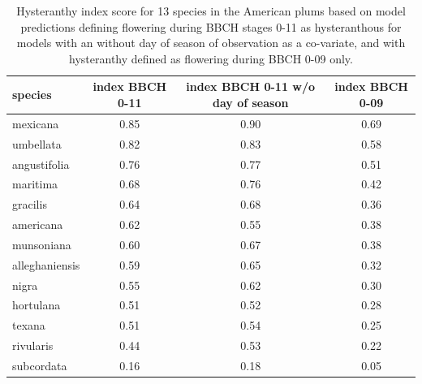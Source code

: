 \documentclass{article}[11pt]
\begin{document}
\begin{table}[ht]
\centering
\begin{tabular}{|lccc|}
  \hline
  species & index BBCH 0-11 & index BBCH 0-11 w/o day of season & index BBCH 0-09 \\ 
  \hline
 mexicana & 0.85 & 0.90 & 0.69 \\ 
  umbellata & 0.82 & 0.83 & 0.58 \\ 
 angustifolia & 0.76 & 0.77 & 0.51 \\ 
  maritima & 0.68 & 0.76 & 0.42 \\ 
 gracilis & 0.64 & 0.68 & 0.36 \\ 
  americana & 0.62 & 0.55 & 0.38 \\ 
  munsoniana & 0.60 & 0.67 & 0.38 \\ 
 alleghaniensis & 0.59 & 0.65 & 0.32 \\ 
  nigra & 0.55 & 0.62 & 0.30 \\ 
   hortulana & 0.51 & 0.52 & 0.28 \\ 
   texana & 0.51 & 0.54 & 0.25 \\ 
   rivularis & 0.44 & 0.53 & 0.22 \\ 
   subcordata & 0.16 & 0.18 & 0.05 \\ 
   \hline
\end{tabular}
\label{tab:mod1comps}
\caption{Hysteranthy index score for 13 species in the American plums based on model predictions defining flowering during BBCH stages 0-11 as hysteranthous for models with an without day of season of observation as a co-variate, and with hysteranthy defined as flowering during BBCH 0-09 only. }
\end{table}
\end{document}

